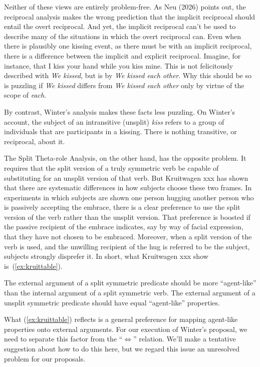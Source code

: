 \documentclass[twoside, 12pt]{article}
\begin{document}
Neither of these views are entirely problem-free. As Neu (2026) points out, the reciprocal analysis makes the wrong prediction that the implicit reciprocal should entail the overt reciprocal. And yet, the implicit reciprocal can't be used to describe many of the situations in which the overt reciprocal can. Even when there is plausibly one kissing event, as there must be with an implicit reciprocal, there is a difference between the implicit and explicit reciprocal. Imagine, for instance, that I kiss your hand while you kiss mine. This is not felicitously described with \textit{We kissed}, but is by \textit{We kissed each other}. Why this should be so is puzzling if \textit{We kissed} differs from \textit{We kissed each other} only by virtue of the scope of \textit{each}.

By contrast, Winter's analysis makes these facts less puzzling. On Winter's account, the subject of an intransitive (unsplit) \textit{kiss} refers to a group of individuals that are participants in a kissing. There is nothing transitive, or reciprocal, about it. 

The Split Theta-role Analysis, on the other hand, has the opposite problem. It requires that the split version of a truly symmetric verb be capable of substituting for an unsplit version of that verb. But Kruitwagen xxx has shown that there are systematic differences in how subjects choose these two frames. In experiments in which subjects are shown one person hugging another person who is passively accepting the embrace, there is a clear preference to use the split version of the verb rather than the unsplit version. That preference is boosted if the passive recipient of the embrace indicates, say by way of facial expression, that they have not chosen to be embraced. Moreover, when a split version of the verb is used, and the unwilling recipient of the hug is referred to be the subject, subjects strongly disprefer it. In short, what Kruitwagen xxx show is~(\ref{ex:kruittable}).
\begin{exe}
\raggedright
  \ex \label{ex:kruittable}
  \begin{xlist}
    \ex The external argument of a split symmetric predicate should be more ``agent-like'' than the internal argument of a split symmetric verb.
    \ex The external argument of a unsplit symmetric predicate should have equal ``agent-like'' properties.
  \end{xlist}
\end{exe}
What (\ref{ex:kruittable}) reflects is a general preference for mapping agent-like properties onto external arguments. For our execution of Winter's proposal, we need to separate this factor from the ``$\Leftrightarrow$'' relation. We'll make a tentative suggestion about how to do this here, but we regard this issue an unresolved problem for our proposals.
\end{document}

